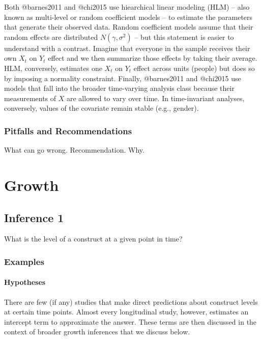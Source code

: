\documentclass[]{article}
\let\oldparagraph\paragraph
\renewcommand{\paragraph}[1]{\oldparagraph{#1}\mbox{}}
\begin{document}
Both @barnes2011 and @chi2015 use hiearchical linear modeling (HLM) --
also known as multi-level or random coefficient models -- to estimate
the parameters that generate their observed data. Random coefficient
models assume that their random effects are distributed
\(N(\gamma, \sigma^2)\) -- but this statement is easier to understand
with a contrast. Imagine that everyone in the sample receives their own
\(X_t\) on \(Y_t\) effect and we then summarize those effects by taking
their average. HLM, conversely, estimates one \(X_t\) on \(Y_t\) effect
across units (people) but does so by imposing a normality constraint.
Finally, @barnes2011 and @chi2015 use models that fall into the broader
time-varying analysis class because their measurements of \(X\) are
allowed to vary over time. In time-invariant analyses, conversely,
values of the covariate remain stable (e.g., gender).

\hypertarget{pitfalls-and-recommendations}{%
\subsubsection{Pitfalls and
Recommendations}\label{pitfalls-and-recommendations}}

What can go wrong. Recommendation. Why.

\hypertarget{growth}{%
\section{Growth}\label{growth}}

\hypertarget{inference-1-1}{%
\subsection{Inference 1}\label{inference-1-1}}

What is the level of a construct at a given point in time?

\hypertarget{examples-1}{%
\subsubsection{Examples}\label{examples-1}}

\hypertarget{hypotheses-1}{%
\paragraph{Hypotheses}\label{hypotheses-1}}

There are few (if any) studies that make direct predictions about
construct levels at certain time points. Almost every longitudinal
study, however, estimates an intercept term to approximate the answer.
These terms are then discussed in the context of broader growth
inferences that we discuss below.
\end{document}
